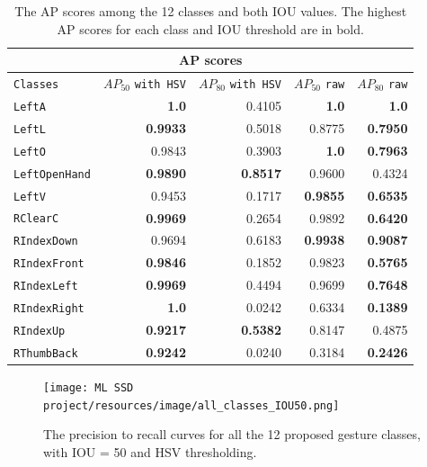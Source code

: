 \documentclass[10pt,twocolumn,letterpaper]{article}
\begin{document}
\begin{flushleft}
\def\arraystretch{1.2}%
\begin{table}[!h]
    \begin{center}    
        \begin{tabular}{l|r|r|r|r}
        \hline
        \multicolumn{5}{c}{AP scores}\\
        \hline
        \hline
        \texttt{Classes} & $AP_{50}$ \texttt{with HSV} & $AP_{80}$ \texttt{with HSV} & $AP_{50}$ \texttt{raw} & $AP_{80}$ \texttt{raw}\\
        \hline
        \texttt{LeftA} & \textbf{1.0} & 0.4105 & \textbf{1.0} & \textbf{1.0} \\
        \hline
        \texttt{LeftL} & \textbf{0.9933} & 0.5018 & 0.8775 & \textbf{0.7950} \\
        \hline
        \texttt{LeftO} & 0.9843 & 0.3903 & \textbf{1.0} & \textbf{0.7963} \\
        \hline
        \texttt{LeftOpenHand} & \textbf{0.9890} & \textbf{0.8517} & 0.9600 & 0.4324 \\
        \hline
        \texttt{LeftV} & 0.9453 & 0.1717 & \textbf{0.9855} & \textbf{0.6535} \\
        \hline
        \texttt{RClearC} & \textbf{0.9969} & 0.2654 & 0.9892 & \textbf{0.6420} \\
        \hline
        \texttt{RIndexDown} & 0.9694 & 0.6183 & \textbf{0.9938} & \textbf{0.9087} \\
        \hline
        \texttt{RIndexFront}  & \textbf{0.9846} & 0.1852 & 0.9823 & \textbf{0.5765} \\
        \hline
        \texttt{RIndexLeft}  & \textbf{0.9969} & 0.4494 & 0.9699 & \textbf{0.7648} \\
        \hline
        \texttt{RIndexRight}  & \textbf{1.0} & 0.0242 & 0.6334 & \textbf{0.1389} \\
        \hline
        \texttt{RIndexUp} & \textbf{0.9217} & \textbf{0.5382} & 0.8147 & 0.4875\\
        \hline
        \texttt{RThumbBack} & \textbf{0.9242} & 0.0240 & 0.3184 & \textbf{0.2426} \\
        \hline
        \end{tabular}
    \end{center}
    \caption{The AP scores among the 12 classes and both IOU values. The highest AP scores for each class and IOU threshold are in bold.}
    \label{table1}
\end{table}

\begin{figure}[!h]
    \centering
    \texttt{[image: ML SSD project/resources/image/all\_classes\_IOU50.png]}
    \caption{The precision to recall curves for all the 12 proposed gesture classes, with IOU = 50 and HSV thresholding.}
\end{figure}
\label{figure7}


\end{flushleft}
\end{document}
